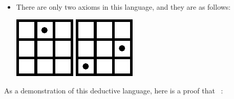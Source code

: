 \documentclass[12pt]{article}
\begin{document}
{\begin{itemize}
So for example if you have the two propositions
and
,
then you can deduce from them that
.
\item There are only two axioms in this language, and they are as follows:
\begin{center}
\includegraphics[scale=\s]{gridgame8.pdf}
\hspace{2em}
\includegraphics[scale=\s]{gridgame9.pdf}
\end{center}
\end{itemize}
As a demonstration of this deductive language, here is a proof that 
\ :
}
\end{document}
